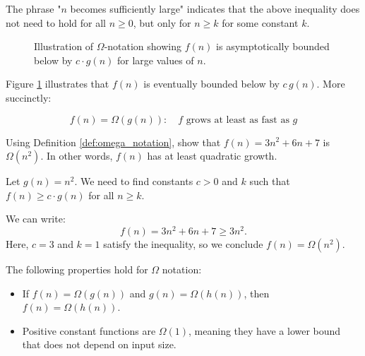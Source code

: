 The phrase "$n$ becomes sufficiently large" indicates that the above inequality does not need to hold for all $n \geq 0$, but only for $n \geq k$ for some constant $k$. 

\begin{figure}[htbp]
    \centering
    \caption{Illustration of \(\Omega\)-notation showing $f(n)$ is asymptotically bounded below by $c \cdot g(n)$ for large values of $n$.}
    \label{fig:omega_notation}
\end{figure}

Figure \ref{fig:omega_notation} illustrates that $f(n)$ is eventually bounded below by $c\,g(n)$. More succinctly:

\[
f(n)=\Omega(g(n)): \quad f \text{ grows at least as fast as } g
\]


\begin{example}
    Using Definition \ref{def:omega_notation}, show that $f(n)=3n^2+6n+7$ is $\Omega(n^2)$. In other words, $f(n)$ has at least quadratic growth.
\end{example}

\begin{solution}
    Let $g(n) = n^2$. We need to find constants $c > 0$ and $k$ such that $f(n) \geq c \cdot g(n)$ for all $n \geq k$.

    We can write:
    \[
    f(n) = 3n^2 + 6n + 7 \geq 3n^2.
    \]
    Here, $c = 3$ and $k = 1$ satisfy the inequality, so we conclude $f(n) = \Omega(n^2)$.
\end{solution}

The following properties hold for $\Omega$ notation:
\begin{itemize}
    \item If $f(n) = \Omega(g(n))$ and $g(n) = \Omega(h(n))$, then $f(n) = \Omega(h(n))$.
    \item Positive constant functions are $\Omega(1)$, meaning they have a lower bound that does not depend on input size.
\end{itemize}


